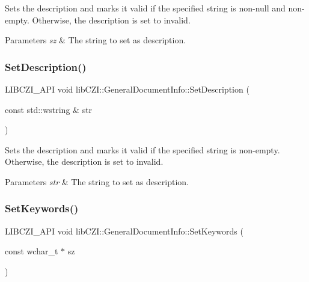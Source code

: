 Sets the description and marks it valid if the specified string is non-\/null and non-\/empty. Otherwise, the description is set to invalid.


\begin{DoxyParams}{Parameters}
{\em sz} & The string to set as description. \\
\hline
\end{DoxyParams}
\mbox{\label{structlib_c_z_i_1_1_general_document_info_ac5d60eb8819a6f91f33ac7177091b29b}} 
\subsubsection{\texorpdfstring{Set\+Description()}{SetDescription()}\hspace{0.1cm}{\footnotesize\ttfamily [2/2]}}
{\footnotesize\ttfamily L\+I\+B\+C\+Z\+I\+\_\+\+A\+PI void lib\+C\+Z\+I\+::\+General\+Document\+Info\+::\+Set\+Description (\begin{DoxyParamCaption}\item[{const std\+::wstring \&}]{str }\end{DoxyParamCaption})\hspace{0.3cm}{\ttfamily [inline]}}

Sets the description and marks it valid if the specified string is non-\/empty. Otherwise, the description is set to invalid.


\begin{DoxyParams}{Parameters}
{\em str} & The string to set as description. \\
\hline
\end{DoxyParams}
\mbox{\label{structlib_c_z_i_1_1_general_document_info_a1ab8bf3071f47e2275d29853f49ce472}} 
\subsubsection{\texorpdfstring{Set\+Keywords()}{SetKeywords()}\hspace{0.1cm}{\footnotesize\ttfamily [1/2]}}
{\footnotesize\ttfamily L\+I\+B\+C\+Z\+I\+\_\+\+A\+PI void lib\+C\+Z\+I\+::\+General\+Document\+Info\+::\+Set\+Keywords (\begin{DoxyParamCaption}\item[{const wchar\+\_\+t $\ast$}]{sz }\end{DoxyParamCaption})\hspace{0.3cm}{\ttfamily [inline]}}

